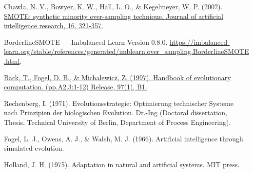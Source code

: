 \begin{thebibliography}{9}

	\href{https://www.jair.org/index.php/jair/article/view/10302}{Chawla, N. V., Bowyer, K. W., Hall, L. O., \& Kegelmeyer, W. P. (2002). SMOTE: synthetic minority over-sampling technique. Journal of artificial intelligence research, 16, 321-357.}


	BorderlineSMOTE — Imbalanced Learn Version 0.8.0. \url{https://imbalanced-learn.org/stable/references/generated/imblearn.over_sampling.BorderlineSMOTE.html}.



	\href{https://www.researchgate.net/publication/216300863_A_history_of_evolutionary_computation}{Bäck, T., Fogel, D. B., \& Michalewicz, Z. (1997). Handbook of evolutionary computation. (pp.A2.3:1-12) Release, 97(1), B1.}


	Rechenberg, I. (1971). Evolutionsstrategie: Optimierung technischer Systeme nach Prinzipien der biologischen Evolution. Dr.-Ing (Doctoral dissertation, Thesis, Technical University of Berlin, Department of Process Engineering).


	Fogel, L. J., Owens, A. J., \& Walsh, M. J. (1966). Artificial intelligence through simulated evolution.


	Holland, J. H. (1975). Adaptation in natural and artificial systems. MIT press.





\end{thebibliography}
